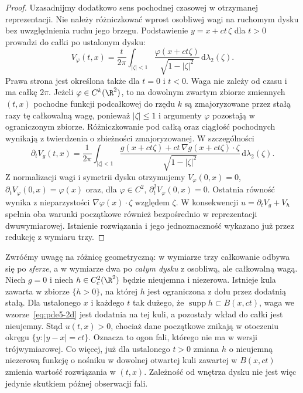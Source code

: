 \begin{proof}
Uzasadnijmy dodatkowo sens pochodnej czasowej
w otrzymanej reprezentacji. Nie należy różniczkować
wprost osobliwej wagi na ruchomym dysku bez
uwzględnienia ruchu jego brzegu.
Podstawienie $y=x+ct\,\zeta$ dla $t>0$
prowadzi do całki po ustalonym dysku:
\[
 V_\varphi(t,x)=\frac{t}{2\pi}
 \int_{|\zeta|<1}\frac{\varphi(x+ct\zeta)}
 {\sqrt{1-|\zeta|^2}}\,\mathrm d\lambda_2(\zeta).
\]
Prawa strona jest określona także dla $t=0$
i $t<0$. Waga nie zależy od czasu i ma całkę $2\pi$.
Jeżeli $\varphi\in C^k(\R^2)$, to na dowolnym
zwartym zbiorze zmiennych $(t,x)$ pochodne
funkcji podcałkowej do rzędu $k$ są zmajoryzowane
przez stałą razy tę całkowalną wagę, ponieważ
$|\zeta|\leq1$ i argumenty $\varphi$ pozostają
w ograniczonym zbiorze. Różniczkowanie pod całką
oraz ciągłość pochodnych wynikają z twierdzenia
o zbieżności zmajoryzowanej. W szczególności
\[
 \partial_t V_g(t,x)=\frac1{2\pi}
 \int_{|\zeta|<1}\frac{g(x+ct\zeta)
 +ct\,\nabla g(x+ct\zeta)\cdot\zeta}
 {\sqrt{1-|\zeta|^2}}\,\mathrm d\lambda_2(\zeta).
\]
Z normalizacji wagi i symetrii dysku otrzymujemy
$V_\varphi(0,x)=0$, $\partial_tV_\varphi(0,x)=\varphi(x)$
oraz, dla $\varphi\in C^2$,
$\partial_t^2V_\varphi(0,x)=0$.
Ostatnia równość wynika z nieparzystości
$\nabla\varphi(x)\cdot\zeta$ względem $\zeta$.
W konsekwencji $u=\partial_tV_g+V_h$ spełnia
oba warunki początkowe również bezpośrednio
w reprezentacji dwuwymiarowej. Istnienie rozwiązania
i jego jednoznaczność wykazano już
przez redukcję z wymiaru trzy.
\end{proof}

Zwróćmy uwagę na różnicę geometryczną: w wymiarze
trzy całkowanie odbywa się po \emph{sferze},
a w wymiarze dwa po \emph{całym dysku} z osobliwą,
ale całkowalną wagą. Niech $g=0$ i niech
$h\in C_c^2(\R^2)$ będzie nieujemna i niezerowa.
Istnieje kula zawarta w zbiorze $\{h>0\}$,
na której $h$ jest ograniczona z dołu przez
dodatnią stałą. Dla ustalonego $x$ i każdego
$t$ tak dużego, że $\operatorname{supp}h\subset B(x,ct)$,
waga we wzorze~\eqref{eq:pde5-2d} jest dodatnia
na tej kuli, a pozostały wkład do całki jest
nieujemny. Stąd $u(t,x)>0$, chociaż dane
początkowe znikają w otoczeniu okręgu
$\{y:|y-x|=ct\}$. Oznacza to ogon fali,
którego nie ma w wersji trójwymiarowej.
Co więcej, już dla ustalonego $t>0$ zmiana
$h$ o nieujemną niezerową funkcję o nośniku
w dowolnej otwartej kuli zawartej w $B(x,ct)$
zmienia wartość rozwiązania w $(t,x)$.
Zależność od wnętrza dysku nie jest więc
jedynie skutkiem późnej obserwacji fali.

